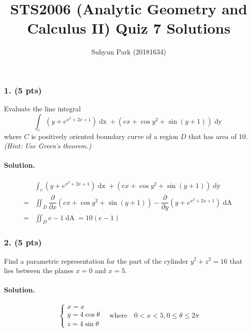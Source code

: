 
	


\title{STS2006 (Analytic Geometry and Calculus II) \newline Quiz 7 Solutions}
\author{Suhyun Park (20181634)}
\maketitle

\subsubsection{1. (5 pts)} Evaluate the line integral \[\int_c \left(y+e^{x^2+2x+1}\right)\mathop{dx}+\left(ex+\cos y^2+\sin\left(y+1\right)\right)\mathop{dy}\] where $C$ is positively oriented boundary curve of a region $D$ that has area of 10. \textit{(Hint: Use Green's theorem.)}

\paragraph{Solution.}
\begin{align*}
	& \int_c \left(y+e^{x^2+2x+1}\right)\mathop{dx}+\left(ex+\cos y^2+\sin\left(y+1\right)\right)\mathop{dy}\\
	=& \iint_D \dfrac{\partial}{\partial x}\left(ex+\cos y^2+\sin\left(y+1\right)\right) 
		- \dfrac{\partial}{\partial y}\left(y+e^{x^2+2x+1}\right)\mathop{dA}\\
	=& \iint_D e-1\mathop{dA} = 10\left(e-1\right)
\end{align*}
\par

\subsubsection{2. (5 pts)} Find a parametric representation for the part of the cylinder $y^2+z^2=16$ that lies between the planes $x=0$ and $x=5$.

\paragraph{Solution.} \[
	\begin{cases}
		x=x \\
		y=4\cos\theta \\
		z=4\sin\theta
	\end{cases}\quad\text{where}\quad 0<x<5, 0\leq\theta\leq2\pi
\]


